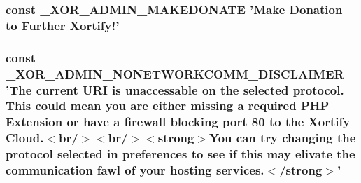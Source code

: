 \hypertarget{admin_8php_af82fe39e33f488420d749c6e47e9b9cd}{
\subsubsection[{\-\_\-\-X\-O\-R\-\_\-\-A\-D\-M\-I\-N\-\_\-\-M\-A\-K\-E\-D\-O\-N\-A\-T\-E}]{\setlength{\rightskip}{0pt plus 5cm}const \-\_\-\-X\-O\-R\-\_\-\-A\-D\-M\-I\-N\-\_\-\-M\-A\-K\-E\-D\-O\-N\-A\-T\-E 'Make Donation to Further Xortify!'}}\label{admin_8php_af82fe39e33f488420d749c6e47e9b9cd}
\hypertarget{admin_8php_a748f2b5592be47602cd0faae99c6c736}{
\subsubsection[{\-\_\-\-X\-O\-R\-\_\-\-A\-D\-M\-I\-N\-\_\-\-N\-O\-N\-E\-T\-W\-O\-R\-K\-C\-O\-M\-M\-\_\-\-D\-I\-S\-C\-L\-A\-I\-M\-E\-R}]{\setlength{\rightskip}{0pt plus 5cm}const \-\_\-\-X\-O\-R\-\_\-\-A\-D\-M\-I\-N\-\_\-\-N\-O\-N\-E\-T\-W\-O\-R\-K\-C\-O\-M\-M\-\_\-\-D\-I\-S\-C\-L\-A\-I\-M\-E\-R 'The current U\-R\-I is unaccessable on the selected protocol. This could mean you are either missing a required P\-H\-P Extension or have a firewall blocking port 80 to the Xortify Cloud.$<$br/$>$$<$br/$>$$<$strong$>$You can try changing the protocol selected in preferences to see {\bf if} this may elivate the communication fawl of your hosting services.$<$/strong$>$'}}\label{admin_8php_a748f2b5592be47602cd0faae99c6c736}
